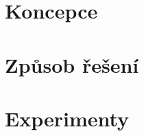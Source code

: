 \documentclass[11pt]{article}
\begin{document}
	\section{Koncepce}




	\section{Způsob řešení}

	\section{Experimenty}
\end{document}
